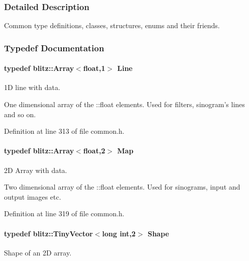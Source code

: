 \subsubsection{Detailed Description}
Common type definitions, classes, structures, enums and their friends. 

\subsubsection{Typedef Documentation}
\hypertarget{group__Types_ga4ce3fdeba27702c8b09a141e22709e38}{
\paragraph[{Line}]{\setlength{\rightskip}{0pt plus 5cm}typedef blitz::Array$<$float,1$>$ {\bf Line}}\hfill}
\label{group__Types_ga4ce3fdeba27702c8b09a141e22709e38}


1D line with data. 

One dimensional array of the ::float elements. Used for filters, sinogram's lines and so on. 

Definition at line 313 of file common.h.

\hypertarget{group__Types_ga8747378c016fc11d9ecbb98787248c25}{
\paragraph[{Map}]{\setlength{\rightskip}{0pt plus 5cm}typedef blitz::Array$<$float,2$>$ {\bf Map}}\hfill}
\label{group__Types_ga8747378c016fc11d9ecbb98787248c25}


2D Array with data. 

Two dimensional array of the ::float elements. Used for sinograms, input and output images etc. 

Definition at line 319 of file common.h.

\hypertarget{group__Types_ga777964671cb4315ce8c56c920db031e3}{
\paragraph[{Shape}]{\setlength{\rightskip}{0pt plus 5cm}typedef blitz::TinyVector$<$long int,2$>$ {\bf Shape}}\hfill}
\label{group__Types_ga777964671cb4315ce8c56c920db031e3}


Shape of an 2D array. 



